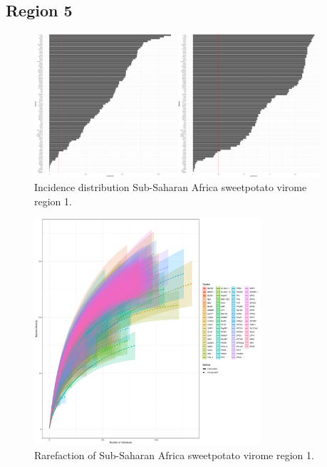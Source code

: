\documentclass{article}
\begin{document}
\subsection{Region 5}

\begin{figure}[h!]
\begin{center}
\includegraphics[width=0.95\textwidth]{../results/k-cluster5/5-kcluster_incidence_w+bFeb28.pdf
} %
\caption{Incidence distribution Sub-Saharan Africa sweetpotato virome region 1.}
\end{center}
\end{figure}


\begin{figure}[h!]
\begin{center}
\includegraphics[width=0.75\textwidth]{../results/k-cluster5/5-kcluster_rarefaction-iNEXT_Feb28.pdf
} %
\caption{Rarefaction of Sub-Saharan Africa sweetpotato virome region 1.}
\end{center}
\end{figure}
\end{document}
